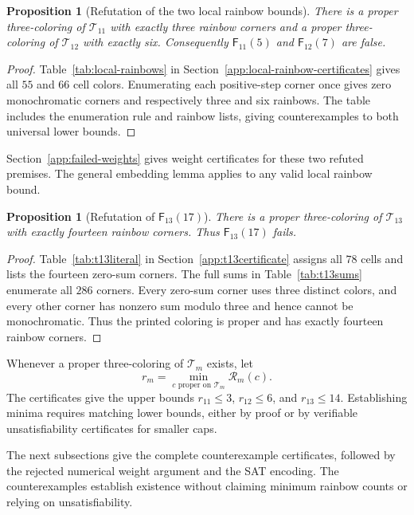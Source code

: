 \documentclass[11pt,a4paper]{article}
\newif\ifshowrevisions
\newenvironment{revision}{\par\begingroup\ifshowrevisions\color{red}\fi}{\par\endgroup}
\newtheorem{proposition}[theorem]{Proposition}
\theoremstyle{definition}
\newcommand{\Ttri}{\mathcal T}
\newcommand{\F}{\mathsf F}
\numberwithin{equation}{section}
\begin{document}
\begin{proposition}[Refutation of the two local rainbow bounds]\label{prop:local-rainbows}
	There is a proper three-coloring of $\Ttri_{11}$ with exactly three rainbow corners and a proper three-coloring of $\Ttri_{12}$ with exactly six. Consequently $\F_{11}(5)$ and $\F_{12}(7)$ are false.
\end{proposition}

\begin{proof}
Table~\ref{tab:local-rainbows} in Section~\ref{app:local-rainbow-certificates} gives all $55$ and $66$ cell colors. Enumerating each positive-step corner once gives zero monochromatic corners and respectively three and six rainbows. The table includes the enumeration rule and rainbow lists, giving counterexamples to both universal lower bounds.
\end{proof}

Section~\ref{app:failed-weights} gives weight certificates for these two refuted premises. The general embedding lemma applies to any valid local rainbow bound.

\begin{proposition}[Refutation of $\F_{13}(17)$]\label{prop:t13}
	There is a proper three-coloring of $\Ttri_{13}$ with exactly fourteen rainbow corners. Thus $\F_{13}(17)$ fails.
\end{proposition}
\begin{proof}
Table~\ref{tab:t13literal} in Section~\ref{app:t13certificate} assigns all $78$ cells and lists the fourteen zero-sum corners. The full sums in Table~\ref{tab:t13sums} enumerate all $286$ corners. Every zero-sum corner uses three distinct colors, and every other corner has nonzero sum modulo three and hence cannot be monochromatic. Thus the printed coloring is proper and has exactly fourteen rainbow corners.
\end{proof}

Whenever a proper three-coloring of $\Ttri_m$ exists, let
\[
r_m=\min_{c\text{ proper on }\Ttri_m}\mathcal R_m(c).
\]
The certificates give the upper bounds $r_{11}\le3$, $r_{12}\le6$, and $r_{13}\le14$. Establishing minima requires matching lower bounds, either by proof or by verifiable unsatisfiability certificates for smaller caps.

\begin{revision}
The next subsections give the complete counterexample certificates, followed by the rejected numerical weight argument and the SAT encoding. The counterexamples establish existence without claiming minimum rainbow counts or relying on unsatisfiability.
\end{revision}
\FloatBarrier
\end{document}
